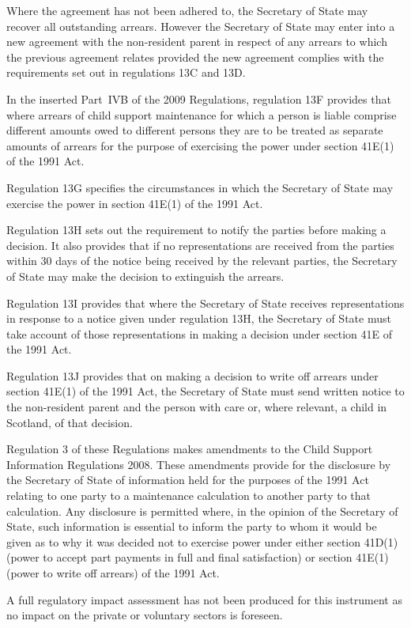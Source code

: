 \documentclass[12pt,a4paper]{article}
\begin{document}
Where the agreement has not been adhered to, the Secretary of State may recover all outstanding arrears. However the Secretary of State may enter into a new agreement with the non-resident parent in respect of any arrears to which the previous agreement relates provided the new agreement complies with the requirements set out in regulations 13C and 13D.

In the inserted Part~IVB of the 2009 Regulations, regulation 13F provides that where arrears of child support maintenance for which a person is liable comprise different amounts owed to different persons they are to be treated as separate amounts of arrears for the purpose of exercising the power under section 41E(1) of the 1991 Act.

Regulation 13G specifies the circumstances in which the Secretary of State may exercise the power in section 41E(1) of the 1991 Act.

Regulation 13H sets out the requirement to notify the parties before making a decision. It also provides that if no representations are received from the parties within 30 days of the notice being received by the relevant parties, the Secretary of State may make the decision to extinguish the arrears.

Regulation 13I provides that where the Secretary of State receives representations in response to a notice given under regulation 13H, the Secretary of State must take account of those representations in making a decision under section 41E of the 1991 Act.

Regulation 13J provides that on making a decision to write off arrears under section 41E(1) of the 1991 Act, the Secretary of State must send written notice to the non-resident parent and the person with care or, where relevant, a child in Scotland, of that decision.

Regulation 3 of these Regulations makes amendments to the Child Support Information Regulations 2008. These amendments provide for the disclosure by the Secretary of State of information held for the purposes of the 1991 Act relating to one party to a maintenance calculation to another party to that calculation. Any disclosure is permitted where, in the opinion of the Secretary of State, such information is essential to inform the party to whom it would be given as to why it was decided not to exercise power under either section 41D(1) (power to accept part payments in full and final satisfaction) or section 41E(1) (power to write off arrears) of the 1991 Act.

A full regulatory impact assessment has not been produced for this instrument as no impact on the private or voluntary sectors is foreseen. 
\end{document}

